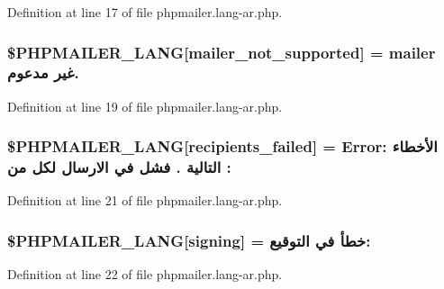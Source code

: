 Definition at line 17 of file phpmailer.\+lang-\/ar.\+php.

\subsubsection[{\texorpdfstring{\$\+P\+H\+P\+M\+A\+I\+L\+E\+R\+\_\+\+L\+A\+NG}{$PHPMAILER_LANG}}]{\setlength{\rightskip}{0pt plus 5cm}\$P\+H\+P\+M\+A\+I\+L\+E\+R\+\_\+\+L\+A\+NG\mbox{[}\textquotesingle{}mailer\+\_\+not\+\_\+supported\textquotesingle{}\mbox{]} = \textquotesingle{} mailer غير مدعوم.\textquotesingle{}}\hypertarget{phpmailer_8lang-ar_8php_aa2ebcb8833ee83a7ad67401c4bb3a6ad}{}\label{phpmailer_8lang-ar_8php_aa2ebcb8833ee83a7ad67401c4bb3a6ad}


Definition at line 19 of file phpmailer.\+lang-\/ar.\+php.

\subsubsection[{\texorpdfstring{\$\+P\+H\+P\+M\+A\+I\+L\+E\+R\+\_\+\+L\+A\+NG}{$PHPMAILER_LANG}}]{\setlength{\rightskip}{0pt plus 5cm}\$P\+H\+P\+M\+A\+I\+L\+E\+R\+\_\+\+L\+A\+NG\mbox{[}\textquotesingle{}recipients\+\_\+failed\textquotesingle{}\mbox{]} =  Error\+: الأخطاء التالية \textquotesingle{} . \textquotesingle{}فشل في الارسال لكل من \+: \textquotesingle{}}\hypertarget{phpmailer_8lang-ar_8php_a7589d30bb9b368327c2df015f3e6bcba}{}\label{phpmailer_8lang-ar_8php_a7589d30bb9b368327c2df015f3e6bcba}


Definition at line 21 of file phpmailer.\+lang-\/ar.\+php.

\subsubsection[{\texorpdfstring{\$\+P\+H\+P\+M\+A\+I\+L\+E\+R\+\_\+\+L\+A\+NG}{$PHPMAILER_LANG}}]{\setlength{\rightskip}{0pt plus 5cm}\$P\+H\+P\+M\+A\+I\+L\+E\+R\+\_\+\+L\+A\+NG\mbox{[}\textquotesingle{}signing\textquotesingle{}\mbox{]} = \textquotesingle{}خطأ في التوقيع\+: \textquotesingle{}}\hypertarget{phpmailer_8lang-ar_8php_a68e437bdb9b968a5a67320f03d231565}{}\label{phpmailer_8lang-ar_8php_a68e437bdb9b968a5a67320f03d231565}


Definition at line 22 of file phpmailer.\+lang-\/ar.\+php.

